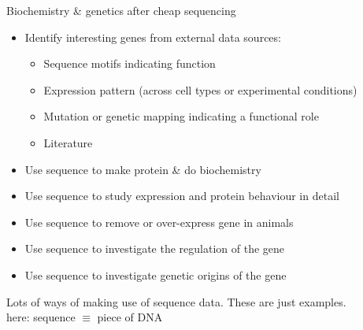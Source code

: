 \documentclass[pdf]{beamer}
\begin{document}
\begin{frame}{Biochemistry \& genetics after cheap sequencing}
  \begin{itemize}
  \item Identify interesting genes from external data sources:
    \pause
    \begin{itemize}
    \item Sequence motifs indicating function
    \item Expression pattern (across cell types or experimental conditions)
    \item Mutation or genetic mapping indicating a functional role
    \item Literature
    \end{itemize}
    \pause
  \item Use sequence to make protein \& do biochemistry
  \item Use sequence to study expression and protein behaviour in detail
  \item Use sequence to remove or over-express gene in animals
  \item Use sequence to investigate the regulation of the gene
  \item Use sequence to investigate genetic origins of the gene
  \end{itemize}
  \pause
  Lots of ways of making use of sequence data. These are just examples.\\
  here: sequence $\equiv$ piece of DNA
\end{frame}
\end{document}
